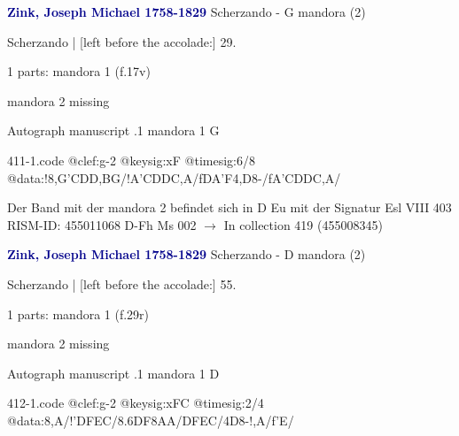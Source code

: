 \documentclass[twocolumn]{book}
\begin{document}
\newline \par \vspace{7pt} \textcolor{darkblue}{\textbf{Zink, Joseph Michael  1758-1829}}
\newline Scherzando - G
\newline mandora (2)
\newline \begin{itshape}[f.17v, at left:] Scherzando | [left before the accolade:] 29.\end{itshape} 
\newline \textcolor{darkblue}{}  1 parts: mandora 1  (f.17v)
\newline \begin{small} mandora 2 missing\end{small} 
\newline Autograph manuscript
.1  mandora 1  G  
\begin{filecontents*}{411-1.code}
@clef:g-2
@keysig:xF
@timesig:6/8
@data:!8,G'CD{D,B}G/!A'CDDC,A/fDA'F4,D8-/fA'CDDC,A/
\end{filecontents*}
\newline
%

\newline Der Band mit der mandora 2 befindet sich in D Eu mit der Signatur Esl VIII 403
\newline RISM-ID: 455011068
\newline D-Fh  Ms 002
\newline $\rightarrow$ In collection 419 (455008345)
      
\newline \par \vspace{7pt} \textcolor{darkblue}{\textbf{Zink, Joseph Michael  1758-1829}}
\newline Scherzando - D
\newline mandora (2)
\newline \begin{itshape}[f.29r, at left:] Scherzando | [left before the accolade:] 55.\end{itshape} 
\newline \textcolor{darkblue}{}  1 parts: mandora 1  (f.29r)
\newline \begin{small} mandora 2 missing\end{small} 
\newline Autograph manuscript
.1  mandora 1  D  
\begin{filecontents*}{412-1.code}
@clef:g-2
@keysig:xFC
@timesig:2/4
@data:8,A/!'DFEC/{8.6DF}8AA/DFEC/4D8-!,A/f'E/
\end{filecontents*}
\newline
%
\end{document}
